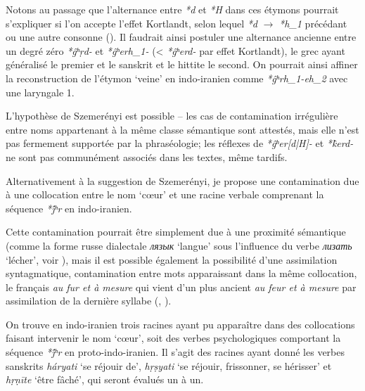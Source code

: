 \documentclass{article}
\newcommand{\ipa}[1]{{\phon\textit{#1}}}
\begin{document}
Notons au passage que l'alternance entre \ipa{*d} et \ipa{*H} dans ces étymons pourrait s'expliquer si l'on accepte l'effet Kortlandt, selon lequel \ipa{*d} $\rightarrow$ \ipa{*h_1} précédant ou une autre consonne (\citealt{kortlandt83numerals, garnier14kortlandt}). Il faudrait ainsi postuler une alternance ancienne entre un degré zéro \ipa{*ĝʰṛd-} et  \ipa{*ĝʰerh_1-} (< \ipa{*ĝʰerd-} par effet Kortlandt), le grec ayant généralisé le premier et le sanskrit et le hittite le second. On pourrait ainsi affiner la reconstruction de l'étymon `veine' en indo-iranien comme \ipa{*ĝʰrh_1-eh_2} avec une laryngale 1.

L'hypothèse de Szemerényi est possible -- les cas de contamination irrégulière entre noms appartenant à la même classe sémantique sont attestés, mais elle n'est pas fermement supportée par la phraséologie; les réflexes de \ipa{*ĝʰer[d|H]-} et \ipa{*k̂erd-} ne sont pas communément associés dans les textes, même tardifs.

Alternativement à la suggestion de Szemerényi, je propose une contamination due à une collocation entre le nom `cœur' et une racine verbale comprenant la séquence \ipa{*j́ʰr} en indo-iranien. 

Cette contamination pourrait être simplement due à une proximité sémantique (comme la forme russe dialectale \ipa{лязык} `langue' sous l'influence du verbe \ipa{лизать} `lécher', voir \citealt[III, 485]{vasmer55russisches}), mais il est possible également la possibilité d'une assimilation syntagmatique, contamination entre mots apparaissant dans la même collocation, le français \ipa{au fur et à mesure} qui vient d'un plus ancient \ipa{au feur et à mesure} par assimilation de la dernière syllabe (\citealt[16]{andersen80morpho}, \citealt[64]{fertig13analogy}). %

On trouve en indo-iranien trois racines ayant pu apparaître dans des collocations faisant intervenir le nom `cœur', soit des verbes psychologiques comportant la séquence \ipa{*j́ʰr} en proto-indo-iranien. Il s'agit des racines ayant donné les verbes sanskrits \ipa{háryati} `se réjouir de', \ipa{hṛṣyati} `se réjouir, frissonner, se hérisser' et \ipa{hṛṇīte} `être fâché', qui seront évalués un à un.
\end{document}

